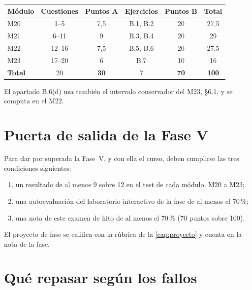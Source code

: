 \begin{center}
\begin{tabular}{@{}lccccc@{}}
\toprule
Módulo & Cuestiones & Puntos A & Ejercicios & Puntos B & Total \\
\midrule
M20 & 1--5 & 7,5 & B.1, B.2 & 20 & 27,5 \\
M21 & 6--11 & 9 & B.3, B.4 & 20 & 29 \\
M22 & 12--16 & 7,5 & B.5, B.6 & 20 & 27,5 \\
M23 & 17--20 & 6 & B.7 & 10 & 16 \\
\midrule
\textbf{Total} & 20 & \textbf{30} & 7 & \textbf{70} & \textbf{100} \\
\bottomrule
\end{tabular}
\end{center}

El apartado B.6(d) usa también el intervalo conservador del M23, §6.1, y se computa en el M22.

\section{Puerta de salida de la Fase V}

Para dar por superada la Fase~V, y con ella el curso, deben cumplirse las tres condiciones siguientes:
\begin{enumerate}[label=\arabic*.]
  \item un resultado de al menos 9 sobre 12 en el test de cada módulo, M20 a M23;
  \item una autoevaluación del laboratorio interactivo de la fase de al menos el $70\,\%$;
  \item una nota de este examen de hito de al menos el $70\,\%$ (70 puntos sobre 100).
\end{enumerate}
El proyecto de fase se califica con la rúbrica de la \cref{cap:proyecto} y cuenta en la nota de la fase.

\section{Qué repasar según los fallos}

